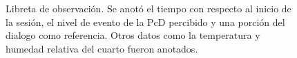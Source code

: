 \begin{figure}[h]
        \centering
        \caption{Libreta de observaci\'on. Se anot\'o el tiempo con respecto al inicio de la sesi\'on, el nivel de evento de la PcD percibido y una porci\'on del dialogo como referencia. Otros datos como la temperatura y humedad relativa del cuarto fueron anotados.}\label{fig:imgobservation}
\end{figure}
